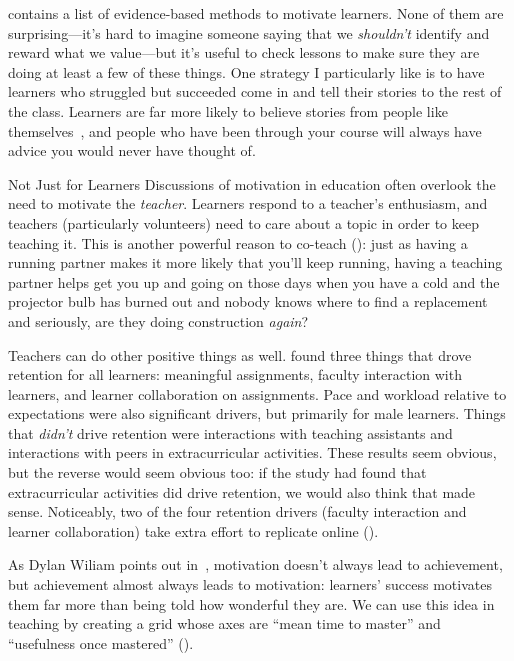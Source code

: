 \cite{Ambr2010} contains a list of evidence-based methods to motivate learners.
None of them are surprising---it's
hard to imagine someone saying that we \emph{shouldn't} identify and reward what we value---but
it's useful to check lessons to make sure they are doing at least a few of these things.
One strategy I particularly like is
to have learners who struggled but succeeded
come in and tell their stories to the rest of the class.
Learners are far more likely to believe stories from people like themselves~\cite{Mill2016a},
and people who have been through your course
will always have advice you would never have thought of.

\begin{aside}{Not Just for Learners}
  Discussions of motivation in education often overlook the need to motivate the \emph{teacher}.
  Learners respond to a teacher's enthusiasm,
  and teachers (particularly volunteers) need to care about a topic in order to keep teaching it.
  This is another powerful reason to co-teach ():
  just as having a running partner makes it more likely that you'll keep running,
  having a teaching partner helps get you up and going on
  those days when you have a cold
  and the projector bulb has burned out
  and nobody knows where to find a replacement
  and seriously,
  are they doing construction \emph{again}?
\end{aside}

Teachers can do other positive things as well.
\cite{Bark2014} found three things that drove retention for all learners:
meaningful assignments,
faculty interaction with learners,
and learner collaboration on assignments.
Pace and workload relative to expectations were also significant drivers,
but primarily for male learners.
Things that \emph{didn't} drive retention
were interactions with teaching assistants
and interactions with peers in extracurricular activities.
These results seem obvious,
but the reverse would seem obvious too:
if the study had found that extracurricular activities did drive retention,
we would also think that made sense.
Noticeably,
two of the four retention drivers (faculty interaction and learner collaboration)
take extra effort to replicate online ().


As Dylan Wiliam points out in~\cite{Hend2017},
motivation doesn't always lead to achievement,
but achievement almost always leads to motivation:
learners' success motivates them far more than being told how wonderful they are.
We can use this idea in teaching
by creating a grid whose axes are ``mean time to master''
and ``usefulness once mastered'' ().

